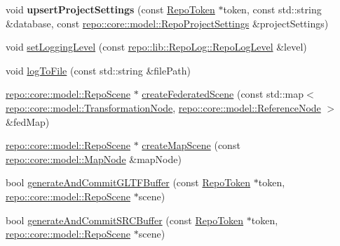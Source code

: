 \begin{DoxyCompactItemize}
\item 
\hypertarget{class_repo_controller_1_1___repo_controller_impl_a5bf9a708e0881befe63ee7ca9c77564e}{}void {\bfseries upsert\+Project\+Settings} (const \hyperlink{class_repo_controller_1_1_repo_token}{Repo\+Token} $\ast$token, const std\+::string \&database, const \hyperlink{classrepo_1_1core_1_1model_1_1_repo_project_settings}{repo\+::core\+::model\+::\+Repo\+Project\+Settings} \&project\+Settings)\label{class_repo_controller_1_1___repo_controller_impl_a5bf9a708e0881befe63ee7ca9c77564e}

\item 
void \hyperlink{class_repo_controller_1_1___repo_controller_impl_a3225af2cde1772f8ff2c9c9472edc107}{set\+Logging\+Level} (const \hyperlink{classrepo_1_1lib_1_1_repo_log_ad1d3f8148a47d718e4bf86a9d1edff81}{repo\+::lib\+::\+Repo\+Log\+::\+Repo\+Log\+Level} \&level)
\item 
void \hyperlink{class_repo_controller_1_1___repo_controller_impl_afb442442442102a59fb9e54995f530d2}{log\+To\+File} (const std\+::string \&file\+Path)
\item 
\hyperlink{classrepo_1_1core_1_1model_1_1_repo_scene}{repo\+::core\+::model\+::\+Repo\+Scene} $\ast$ \hyperlink{class_repo_controller_1_1___repo_controller_impl_ab29956ef42024c97c8cfdf87d34cb7ca}{create\+Federated\+Scene} (const std\+::map$<$ \hyperlink{classrepo_1_1core_1_1model_1_1_transformation_node}{repo\+::core\+::model\+::\+Transformation\+Node}, \hyperlink{classrepo_1_1core_1_1model_1_1_reference_node}{repo\+::core\+::model\+::\+Reference\+Node} $>$ \&fed\+Map)
\item 
\hyperlink{classrepo_1_1core_1_1model_1_1_repo_scene}{repo\+::core\+::model\+::\+Repo\+Scene} $\ast$ \hyperlink{class_repo_controller_1_1___repo_controller_impl_a31df61ff9e8f5d73e1481556aca5625f}{create\+Map\+Scene} (const \hyperlink{classrepo_1_1core_1_1model_1_1_map_node}{repo\+::core\+::model\+::\+Map\+Node} \&map\+Node)
\item 
bool \hyperlink{class_repo_controller_1_1___repo_controller_impl_abd4a39657a5efeda41c23ea09779c258}{generate\+And\+Commit\+G\+L\+T\+F\+Buffer} (const \hyperlink{class_repo_controller_1_1_repo_token}{Repo\+Token} $\ast$token, \hyperlink{classrepo_1_1core_1_1model_1_1_repo_scene}{repo\+::core\+::model\+::\+Repo\+Scene} $\ast$scene)
\item 
bool \hyperlink{class_repo_controller_1_1___repo_controller_impl_a5835ddd087bbc3090ac8d022843d71c6}{generate\+And\+Commit\+S\+R\+C\+Buffer} (const \hyperlink{class_repo_controller_1_1_repo_token}{Repo\+Token} $\ast$token, \hyperlink{classrepo_1_1core_1_1model_1_1_repo_scene}{repo\+::core\+::model\+::\+Repo\+Scene} $\ast$scene)

\end{DoxyCompactItemize}
